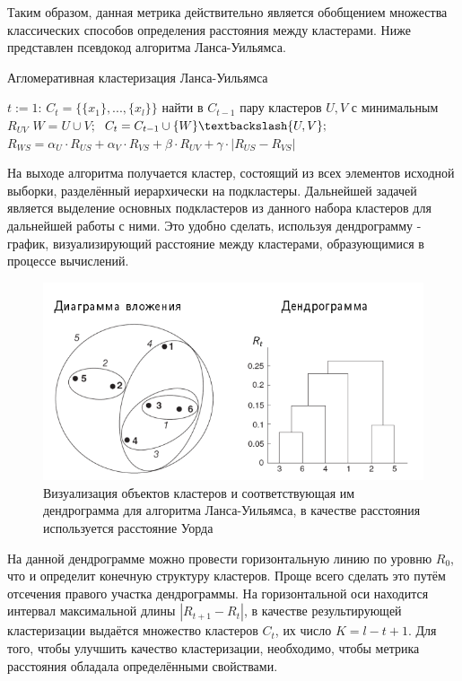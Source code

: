 \begin{itemize}
Таким образом, данная метрика действительно является обобщением множества классических способов определения расстояния между кластерами. Ниже представлен псевдокод алгоритма Ланса-Уильямса.

\begin{algorithm}
\caption{Агломеративная кластеризация Ланса-Уильямса}\label{Lance–Williams}
\begin{algorithmic}
\State $t:=1$: $C_t = \{\{x_1\},...,\{x_l\}\}$
\State найти в $C_{t - 1}$ пару кластеров $U, V$ с минимальным $R_{UV}$
\State $W = U \cup V;$
\State $C_t = C_{t - 1} \cup \{W\} \textbackslash \{U, V\};$
\State $R_{WS} = \alpha_U \cdot R_{US} + \alpha_V \cdot R_{VS} + \beta \cdot R_{UV} + \gamma \cdot |R_{US} - R_{VS}|$

\end{algorithmic}
\end{algorithm}

На выходе алгоритма получается кластер, состоящий из всех элементов исходной выборки, разделённый иерархически на подкластеры. Дальнейшей задачей является выделение основных подкластеров из данного набора кластеров для дальнейшей работы с ними. Это удобно сделать, используя дендрограмму - график, визуализирующий расстояние между кластерами, образующимися в процессе вычислений.

\begin{center}
\begin{figure}[H]
\includegraphics[width=14cm]{png/Dendrogramma.png}
\caption{Визуализация объектов кластеров и соответствующая им дендрограмма для алгоритма Ланса-Уильямса, в качестве расстояния используется расстояние Уорда}
\label{fig:Dendrogramma}
\end{figure}
\end{center}

На данной дендрограмме можно провести горизонтальную линию по уровню $R_0$, что и определит конечную структуру кластеров. Проще всего сделать это путём отсечения правого участка дендрограммы. На горизонтальной оси находится интервал максимальной длины $|R_{t+1} - R_t|$, в качестве результирующей кластеризации выдаётся множество кластеров $C_t$, их число $K = l - t + 1$. Для того, чтобы улучшить качество кластеризации, необходимо, чтобы метрика расстояния обладала определёнными свойствами.


\end{itemize}
